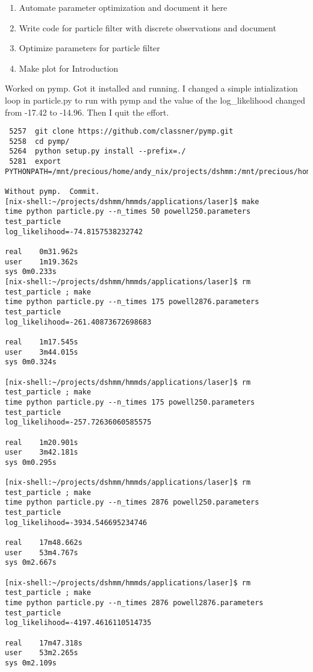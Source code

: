 \documentclass[12pt]{article}
\begin{document}
\begin{enumerate}
\item Automate parameter optimization and document it here
\item Write code for particle filter with discrete observations and document
\item Optimize parameters for particle filter
\item Make plot for Introduction
\end{enumerate}
Worked on pymp.  Got it installed and running.  I changed a simple
intialization loop in particle.py to run with pymp and the value of
the log_likelihood changed from -17.42 to -14.96.  Then I quit the
effort.
\begin{verbatim}
 5257  git clone https://github.com/classner/pymp.git
 5258  cd pymp/
 5264  python setup.py install --prefix=./
 5281  export PYTHONPATH=/mnt/precious/home/andy_nix/projects/dshmm:/mnt/precious/home/andy_nix/projects/proj_hmm/src:/mnt/precious/home/andy_nix/projects/dshmm:/mnt/precious/home/andy_nix/projects/dshmm/pymp:

Without pymp.  Commit.
[nix-shell:~/projects/dshmm/hmmds/applications/laser]$ make
time python particle.py --n_times 50 powell250.parameters test_particle
log_likelihood=-74.8157538232742

real	0m31.962s
user	1m19.362s
sys	0m0.233s
[nix-shell:~/projects/dshmm/hmmds/applications/laser]$ rm test_particle ; make
time python particle.py --n_times 175 powell2876.parameters test_particle
log_likelihood=-261.40873672698683

real	1m17.545s
user	3m44.015s
sys	0m0.324s

[nix-shell:~/projects/dshmm/hmmds/applications/laser]$ rm test_particle ; make
time python particle.py --n_times 175 powell250.parameters test_particle
log_likelihood=-257.72636060585575

real	1m20.901s
user	3m42.181s
sys	0m0.295s

[nix-shell:~/projects/dshmm/hmmds/applications/laser]$ rm test_particle ; make
time python particle.py --n_times 2876 powell250.parameters test_particle
log_likelihood=-3934.546695234746

real	17m48.662s
user	53m4.767s
sys	0m2.667s

[nix-shell:~/projects/dshmm/hmmds/applications/laser]$ rm test_particle ; make
time python particle.py --n_times 2876 powell2876.parameters test_particle
log_likelihood=-4197.4616110514735

real	17m47.318s
user	53m2.265s
sys	0m2.109s

\end{verbatim}
\end{document}
